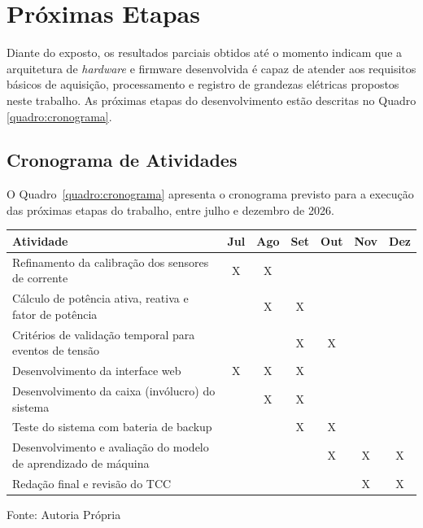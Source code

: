 \section{Próximas Etapas}


Diante do exposto, os resultados parciais obtidos até o momento indicam
que a arquitetura de \textit{hardware} e firmware desenvolvida é capaz
de atender aos requisitos básicos de aquisição, processamento e
registro de grandezas elétricas propostos neste trabalho. As próximas
etapas do desenvolvimento estão descritas no Quadro \ref{quadro:cronograma}.

\subsection{Cronograma de Atividades}

O Quadro~\ref{quadro:cronograma} apresenta o cronograma previsto para
a execução das próximas etapas do trabalho, entre julho e dezembro de
2026.

\begin{quadro}[htb]
\centering
\caption{Cronograma das próximas etapas do trabalho}
\label{quadro:cronograma}
\begin{tabular}{|p{7cm}|c|c|c|c|c|c|}
\hline
\textbf{Atividade} & \textbf{Jul} & \textbf{Ago} & \textbf{Set} & \textbf{Out} & \textbf{Nov} & \textbf{Dez} \\
\hline
Refinamento da calibração dos sensores de corrente & X & X & & & & \\
\hline
Cálculo de potência ativa, reativa e fator de potência & & X & X & & & \\
\hline
Critérios de validação temporal para eventos de tensão & & & X & X & & \\
\hline
Desenvolvimento da interface web & X & X & X & & & \\
\hline
Desenvolvimento da caixa (invólucro) do sistema & & X & X & & & \\
\hline
Teste do sistema com bateria de backup & & & X & X & & \\
\hline
Desenvolvimento e avaliação do modelo de aprendizado de máquina & & & & X & X & X \\
\hline
Redação final e revisão do TCC & & & & & X & X \\
\hline
\end{tabular}

\vspace{0.2cm}
\footnotesize{Fonte: Autoria Própria}
\end{quadro}
